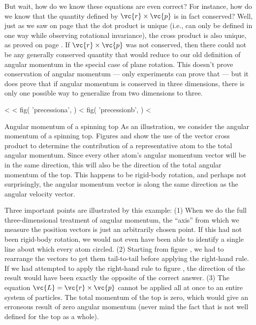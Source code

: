 But wait, how do we know these equations are even correct?
For instance, how do we know that the quantity defined by $\vc{r}\times\vc{p}$
 is in fact conserved? Well, just as we saw on page \pageref{subsec:dotproduct}
that the dot product is unique (i.e., can only be defined in one way while observing
rotational invariance), the cross product is also unique, as proved
on page \pageref{misc:uniquexproof}. If $\vc{r}\times\vc{p}$ was not conserved, then there
could not be any generally conserved quantity that would
reduce to our old definition of angular momentum in the
special case of plane rotation. This doesn't prove conservation of angular momentum ---
only experiments can prove that --- but it does prove that if angular momentum
is conserved in three dimensions, there is only one possible way to generalize from
two dimensions to three.

<%
<%
  fig(
    'precessiona',
  )
\spacebetweenfigs
<%
  fig(
    'precessionb',
  )
<%
\begin{eg}{Angular momentum of a spinning top}
As an
illustration, we consider the angular momentum of a spinning
top. Figures  and  show 
the use of the vector cross product to
determine the contribution of a representative atom to the
total angular momentum. Since every other atom's angular
momentum vector will be in the same direction, this will
also be the direction of the total angular momentum of the
top. This happens to be rigid-body rotation, and perhaps not
surprisingly, the angular momentum vector is along the same
direction as the angular velocity vector.
\end{eg}

Three
important points are illustrated by this example:
(1)
When we do the full three-dimensional treatment of angular
momentum, the ``axis'' from which we measure the position
vectors is just an arbitrarily chosen point. If this had not
been rigid-body rotation, we would not even have been able
to identify a single line about which every atom
circled.
(2) Starting from figure , we had to
rearrange the vectors to get them tail-to-tail before
applying the right-hand rule. If we had attempted to apply
the right-hand rule to figure , the direction of the
result would have been exactly the opposite of the correct
answer.
(3) The equation $\vc{L}=\vc{r}\times\vc{p}$ cannot be applied all at
once to an entire system of particles. The total momentum of
the top is zero, which would give an erroneous result of
zero angular momentum (never mind the fact that  is not
well defined for the top as a whole).

